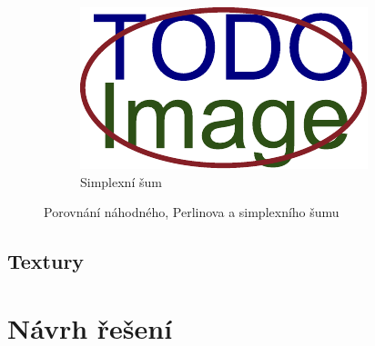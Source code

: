 \begin{figure}[H]
\begin{subfigure}{0.32\textwidth}
	\end{subfigure}
	\hfill
	\begin{subfigure}{0.32\textwidth}
		\includegraphics[width=\textwidth]{obrazky-figures/placeholder.pdf}
		\caption{Simplexní šum}
		\label{fig:perlin:porovnání:simplex}
	\end{subfigure}
	\caption{Porovnání náhodného, Perlinova a simplexního šumu}
	\label{fig:perlin:porovnání}
\end{figure}


\section{Textury}\label{ch:teorie:textury}


%
\chapter{Návrh řešení}\label{ch:navrh}





%
